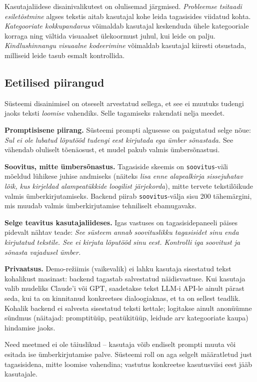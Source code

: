 Kasutajaliidese disainivalikutest on olulisemad järgmised. \emph{Probleemse tsitaadi esiletõstmine} algses tekstis aitab kasutajal kohe leida tagasisides viidatud kohta. \emph{Kategooriate kokkupandavus} võimaldab kasutajal keskenduda ühele kategooriale korraga ning vältida visuaalset ülekoormust juhul, kui leide on palju. \emph{Kindlushinnangu visuaalne kodeerimine} võimaldab kasutajal kiiresti otsustada, milliseid leide tasub esmalt kontrollida.

\subsection{Eetilised piirangud} \label{prototuup:eetika}

Süsteemi disainimisel on otseselt arvestatud sellega, et see ei muutuks tudengi jaoks teksti \emph{loomise} vahendiks. Selle tagamiseks rakendati nelja meedet.

\textbf{Promptisisene piirang.} Süsteemi prompti algusesse on paigutatud selge nõue: \emph{Sul ei ole lubatud lõputööd tudengi eest kirjutada ega ümber sõnastada.} See vähendab oluliselt tõenäosust, et mudel pakub valmis ümbersõnastusi.

\textbf{Soovitus, mitte ümbersõnastus.} Tagasiside skeemis on \texttt{soovitus}-väli mõeldud lühikese juhise andmiseks (näiteks \emph{lisa enne alapealkirja sissejuhatav lõik, kus kirjeldad alampeatükkide loogilist järjekorda}), mitte tervete tekstilõikude valmis ümberkirjutamiseks. Backend piirab \texttt{soovitus}-välja sisu 200 tähemärgini, mis muudab valmis ümberkirjutamise tehniliselt ebamugavaks.

\textbf{Selge teavitus kasutajaliideses.} Igas vastuses on tagasisidepaneeli päises pidevalt nähtav teade: \emph{See süsteem annab soovituslikku tagasisidet sinu enda kirjutatud tekstile. See ei kirjuta lõputööd sinu eest. Kontrolli iga soovitust ja sõnasta vajadusel ümber.}

\textbf{Privaatsus.} Demo-režiimis (vaikevalik) ei lahku kasutaja sisestatud tekst kohalikust masinast: backend tagastab salvestatud näidisvastuse. Kui kasutaja valib mudeliks Claude'i või GPT, saadetakse tekst LLM-i API-le ainult pärast seda, kui ta on kinnitanud konkreetses dialoogiaknas, et ta on sellest teadlik. Kohalik backend ei salvesta sisestatud teksti kettale; logitakse ainult anonüümne sündmus (näitajad: promptitüüp, peatükitüüp, leidude arv kategooriate kaupa) hindamise jaoks.

Need meetmed ei ole täiuslikud – kasutaja võib endiselt prompti muuta või esitada ise ümber\-kirjutamise palve. Süsteemi roll on aga selgelt määratletud just tagasisidena, mitte loomise vahendina; vastutus konkreetse kasutusviisi eest jääb kasutajale.
